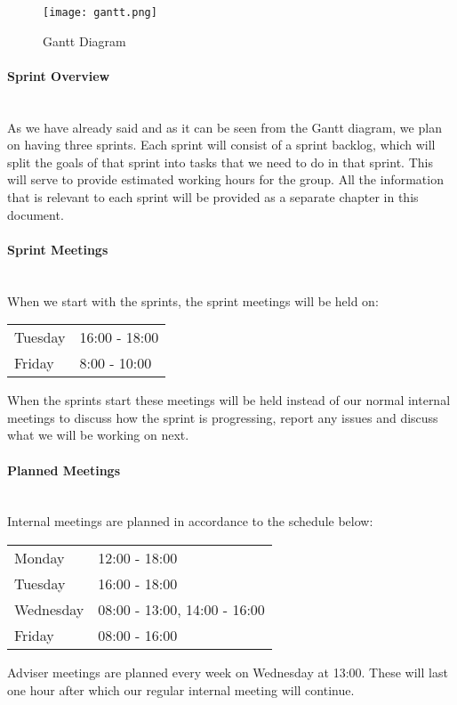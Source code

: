\documentclass[../document.tex]{subfiles}
\begin{document}
\begin{figure}[H]
\centering
\texttt{[image: gantt.png]}
\caption{Gantt Diagram}
\end{figure}

\paragraph{Sprint Overview} \ \\
As we have already said and as it can be seen from the Gantt diagram, we plan on having three sprints. Each sprint will consist of a sprint backlog, which will split the goals of that sprint into tasks that we need to do in that sprint. This will serve to provide estimated working hours for the group. All the information that is relevant to each sprint will be provided as a separate chapter in this document. 

\paragraph{Sprint Meetings} \ \\
When we start with the sprints, the sprint meetings will be held on:

\begin{table}[H]
\begin{tabular}{ll}
\hline
Tuesday	&	16:00 - 18:00 \\
Friday		&	8:00 - 10:00 \\
\hline
\end{tabular}
\end{table}
When the sprints start these meetings will be held instead of our normal internal meetings to discuss how the sprint is progressing, report any issues and discuss what we will be working on next.

\paragraph{Planned Meetings} \ \\
Internal meetings are planned in accordance to the schedule below:

\begin{table}[H]
\begin{tabular}{ll}
\hline
Monday 	&	12:00 - 18:00 \\
Tuesday 	&	16:00 - 18:00 \\
Wednesday 	&	08:00 - 13:00, 14:00 - 16:00 \\
Friday 	&	08:00 - 16:00 \\
\hline
\end{tabular}
\end{table}
Adviser meetings are planned every week on Wednesday at 13:00. These will last one hour after which our regular internal meeting will continue.
\end{document}

